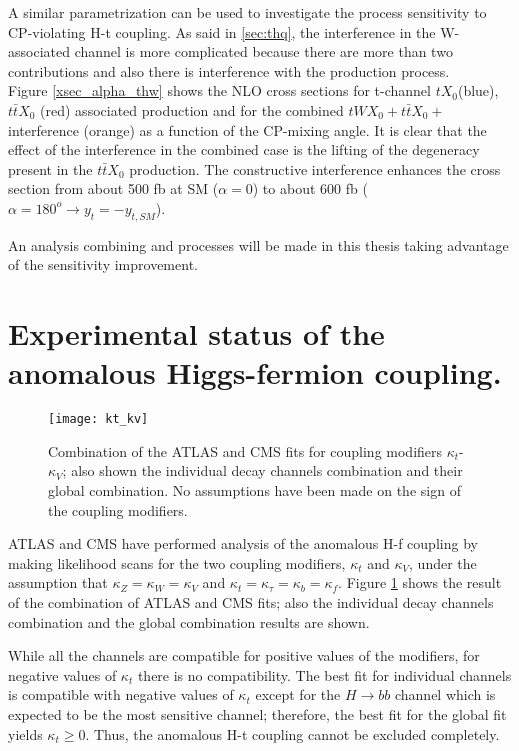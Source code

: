 A similar parametrization can be used to investigate the \tHW process sensitivity to CP-violating H-t coupling. As said in \ref{sec:thq}, the interference in the W-associated channel is more complicated because there are more than two contributions and also there is interference with the \ttH production process.\\

Figure \ref{xsec_alpha_thw} shows the NLO cross sections for t-channel $tX_0$(blue), $t\bar{t}X_0$ (red) associated production and for the combined  $tWX_0 + t\bar{t}X_0 +$ interference (orange) as a function of the CP-mixing angle. It is clear that the effect of the interference in the combined case is the lifting of the degeneracy present in the $t\bar{t}X_0$ production. The constructive interference enhances the cross section from about 500 fb at SM ($\alpha=0$) to about 600 fb ($\alpha=180^o \to y_t=-y_{t,SM}$).  

An analysis combining \tHq and \tHW processes will be made in this thesis taking advantage of the sensitivity improvement.

\section{Experimental status of the anomalous Higgs-fermion coupling.}

\begin{figure}[h!]
\centering
\texttt{[image: kt\_kv]}
\caption[Two dimensional $\kappa_t$-$\kappa_V$ plot of the coupling modifiers. ATLAS and CMS combination.]{Combination of the  ATLAS and CMS fits for coupling modifiers $\kappa_t$-$\kappa_V$; also shown the individual decay channels combination and their global combination. No assumptions have been made on the sign of the coupling modifiers\cite{comb_ht_couplings}.} 
\label{fig:kt_kv}
\end{figure}
 
ATLAS and CMS have performed analysis of the anomalous H-f coupling by making likelihood scans for the two coupling modifiers, $\kappa_t$ and $\kappa_V$, under the assumption that $\kappa_Z=\kappa_W=\kappa_V$ and $\kappa_t=\kappa_\tau=\kappa_b=\kappa_f$. Figure \ref{fig:kt_kv} shows the result of the combination of ATLAS and CMS fits; also the individual decay channels combination and the global combination results are shown.

\noindent While all the channels are compatible for positive values of the modifiers, for negative values of $\kappa_t$ there is no compatibility. The best fit for individual channels is compatible with negative values of $\kappa_t$ except for the $H\to bb$ channel which is expected to be the most sensitive channel; therefore, the best fit for the global fit yields $\kappa_t\geq0$. Thus, the anomalous H-t coupling cannot be excluded completely. 
